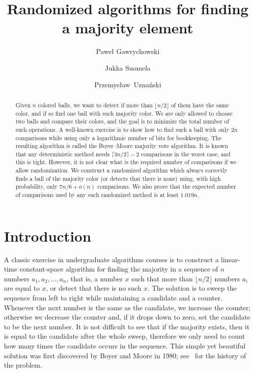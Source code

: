 \documentclass{article}[11pt,a4paper]
\title{Randomized algorithms for finding a majority element}
\author[1]{Pawe\l{} Gawrychowski}
\author[2]{Jukka Suomela}
\author[3]{Przemys\l{}aw~Uzna\'nski}
\affil[1]{Institute of Informatics, University of Warsaw, Poland}
\affil[2]{Helsinki Institute for Information Technology HIIT, \mbox{Department of Computer Science, Aalto University, Finland}}
\affil[3]{Department of Computer Science, ETH Z\"urich, Switzerland}
\date{}
\begin{document}
\maketitle

\begin{abstract}
Given $n$ colored balls, we want to detect if more than $\lfloor n/2\rfloor$ of them
have the same color, and if so find one ball with such majority color. We are only allowed
to choose two balls and compare their colors, and the goal is to minimize
the total number of such operations. A well-known exercise is to show how to find such
a ball with only $2n$ comparisons while using only a logarithmic number of bits for
bookkeeping. The resulting algorithm is called the Boyer--Moore
majority vote algorithm. It is known that any deterministic method needs
$\lceil 3n/2\rceil-2$ comparisons in the worst case, and this is tight.
However, it is not clear what is the required
number of comparisons if we allow randomization. We construct a randomized
algorithm which always correctly finds a ball of the majority color (or detects that there is
none) using, with high probability, only $7n/6+o(n)$ comparisons.
We also prove that the expected number of comparisons used by any such randomized
method is at least $1.019n$.
\end{abstract}

\section{Introduction}

A classic exercise in undergraduate algorithms courses is to construct a linear-time
constant-space algorithm for finding the majority in a sequence of $n$ numbers
$a_1,a_2,\ldots,a_n$, that is, a number $x$ such that more than $\lfloor n/2\rfloor$
numbers $a_i$ are equal to $x$, or detect that there is no such $x$. The solution
is to sweep the sequence from left to right while maintaining a candidate and a counter.
Whenever the next number is the same as the candidate, we increase the counter;
otherwise we decrease the counter and, if it drops down to zero, set the candidate to
be the next number. It is not difficult to see that if the majority exists, then it is
equal to the candidate after the whole sweep, therefore we only need to count how
many times the candidate occurs in the sequence. This simple yet beautiful solution
was first discovered by Boyer and Moore in 1980; see~\cite{MJRTY} for the history of the problem.
\end{document}
